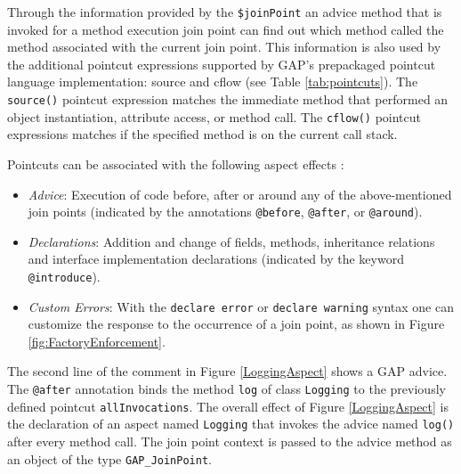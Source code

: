 \documentclass{acm_proc_article-sp}
\begin{document}
Through the information provided by the \texttt{\$joinPoint} an
advice method that is invoked for a method execution join point
can find out which method called the method associated with the
current join point. This information is also used by the
additional pointcut expressions supported by GAP's prepackaged
pointcut language implementation: source and cflow (see Table \ref{tab:pointcuts}).
%
%
The \texttt{source()} pointcut expression matches the immediate
method that performed an object instantiation, attribute access,
or method call. The \texttt{cflow()} pointcut expressions matches
if the specified method is on the current call stack.

Pointcuts can be associated with the following aspect effects
\cite{kr06}:

\begin{itemize}
    \item \emph{Advice}: Execution of code before, after or around
          any of the above-mentioned join points (indicated by the
          annotations \texttt{@before}, \texttt{@after}, or
          \texttt{@around}).
    \item \emph{Declarations}: Addition and change of fields, methods,
          inheritance relations and interface implementation declarations
          (indicated by the keyword \texttt{@introduce}).
    \item \emph{Custom Errors}: With the \texttt{declare error} or
          \texttt{declare warning} syntax one can customize the
          response to the occurrence of a join point, as shown in
          Figure \ref{fig:FactoryEnforcement}.
\end{itemize}

The second line of the comment in Figure \ref{LoggingAspect} shows
a GAP advice. The \texttt{@after} annotation binds the method
\texttt{log} of class \texttt{Logging} to the previously defined
pointcut \texttt{allInvocations}. The overall effect of Figure
\ref{LoggingAspect} is the declaration of an aspect named
\texttt{Logging} that invokes the advice named \texttt{log()}
after every method call. The join point context is passed to the advice
method as an object of the type \texttt{GAP\_JoinPoint}.
\end{document}
